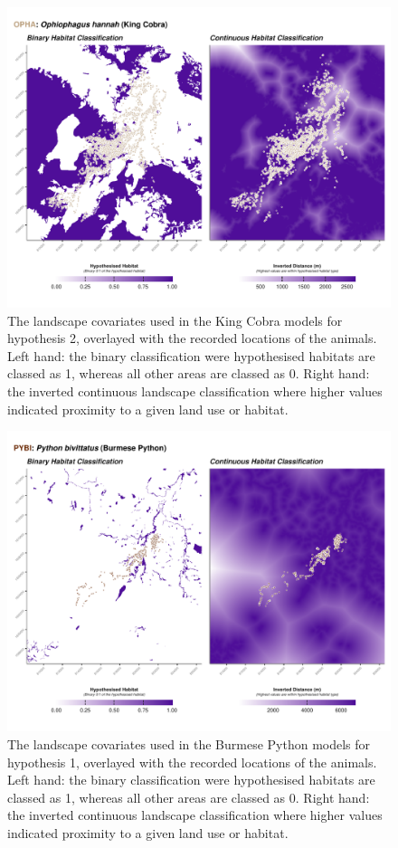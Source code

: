 \documentclass[10pt,a4paper]{article}
\begin{document}
\begin{figure}
\includegraphics[width=1\linewidth]{../../figures/landscape_plot_OPHA_H2} \caption{The landscape covariates used in the King Cobra models for hypothesis 2, overlayed with the recorded locations of the animals. Left hand: the binary classification were hypothesised habitats are classed as 1, whereas all other areas are classed as 0. Right hand: the inverted continuous landscape classification where higher values indicated proximity to a given land use or habitat.}\label{fig:landscapePlotOPHA2}
\end{figure}

\begin{figure}
\includegraphics[width=1\linewidth]{../../figures/landscape_plot_PYBI_H1} \caption{The landscape covariates used in the Burmese Python models for hypothesis 1, overlayed with the recorded locations of the animals. Left hand: the binary classification were hypothesised habitats are classed as 1, whereas all other areas are classed as 0. Right hand: the inverted continuous landscape classification where higher values indicated proximity to a given land use or habitat.}\label{fig:landscapePlotPYBI1}
\end{figure}
\end{document}

